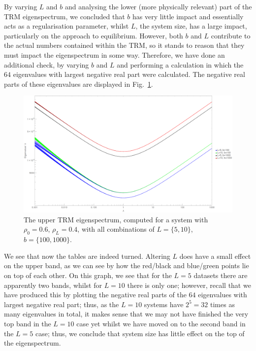 By varying $L$ and $b$ and analysing the lower (more physically relevant) part of the
TRM eigenspectrum, we concluded that $b$ has very little impact and essentially
acts as a regularisation parameter, whilst $L$, the system size, has a large impact,
particularly on the approach to equilibrium. However, both $b$ and $L$ contribute to
the actual numbers contained within the TRM, so it stands to reason that they must
impact the eigenspectrum in some way. Therefore, we have done an additional check,
by varying $b$ and $L$ and 
performing a calculation in which the $64$ eigenvalues with largest negative real
part were calculated. The negative real parts of these eigenvalues are displayed in
Fig.~\ref{fig:eigsVarBVarLUpper}.
 \begin{figure}[h!]
 \caption[The upper TRM eigenspectrum for a system with $L=\{5, 10\}, $, $b=\{100, 1000\}$.]{\label{fig:eigsVarBVarLUpper} 
 The upper TRM eigenspectrum, computed for a system with $\rho_0 = 0.6$, $\rho_L = 0.4$,
 with all combinations of
 $L=\{5, 10\}$, $b=\{100, 1000\}$.
 }
  \begin{center}
 \includegraphics[width=1.0\textheight, angle=270]{TRM/images/topEigs}
  \end{center}
\end{figure}
We see that now the tables are indeed turned. Altering $L$ does have a small effect on
the upper band, as we can see by how the red/black and blue/green points lie on top
of each other. On this graph, we see that for the $L=5$ datasets there are apparently
two bands, whilst for $L=10$ there is only one; however, recall that we have produced
this by plotting the negative real parts of the $64$ eigenvalues with largest negative
real part; thus, as the $L=10$ systems have $2^5 = 32$ times as many eigenvalues in 
total, it makes sense that we may not have finished the very top band in the $L=10$
case yet whilst we have moved on to the second band in the $L=5$ case; thus, we conclude that
system size has little effect on the top of the eigenspectrum.

